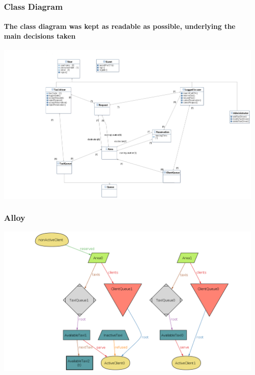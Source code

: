 \documentclass[10pt,xcolor={usenames,dvipsnames}]{beamer}
\begin{document}
\begin{frame}
	\frametitle{Class Diagram}
	\framesubtitle{The class diagram was kept as readable as possible, underlying the main decisions taken}
	\begin{center}
		\includegraphics[width=\textwidth,height=\textheight,keepaspectratio]{ClassDiagram}
	\end{center}
\end{frame}
\begin{frame}
	\frametitle{Alloy}
	\begin{center}
		\includegraphics[width=\textwidth,height=\textheight,keepaspectratio]{reserved-and-refused}
	\end{center}
\end{frame}
\end{document}
